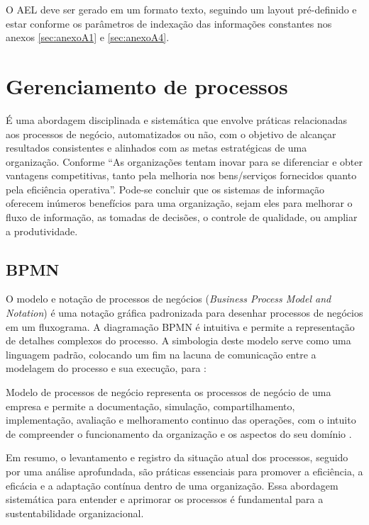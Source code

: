 O AEL deve ser gerado em um formato texto, seguindo um layout pré-definido e estar conforme os parâmetros de indexação das informações constantes nos anexos \ref{sec:anexoA1} e \ref{sec:anexoA4}.

\section{Gerenciamento de processos}
É uma abordagem disciplinada e sistemática que envolve práticas relacionadas aos processos de negócio, automatizados ou não, com o objetivo de alcançar resultados consistentes e alinhados com as metas estratégicas de uma organização. 
Conforme  ``As organizações tentam inovar para se diferenciar e obter vantagens competitivas, tanto pela melhoria nos bens/serviços fornecidos quanto pela eficiência operativa''.
 Pode-se concluir que os sistemas de informação oferecem inúmeros benefícios para uma organização, sejam eles para melhorar o fluxo de informação, as tomadas de decisões, o controle de qualidade, ou ampliar a produtividade.
 
 \subsection{BPMN}
O modelo e notação de processos de negócios (\textit{Business Process Model and Notation}) é uma notação gráfica padronizada para desenhar processos de negócios em um fluxograma. A diagramação BPMN é intuitiva e permite a representação de detalhes complexos do processo. A simbologia deste modelo serve como uma linguagem padrão, colocando um fim na lacuna de comunicação entre a modelagem do processo e sua execução, para :
\begin{citacao}
	
	Modelo de processos de negócio representa os processos de negócio de uma empresa e permite a documentação, simulação, compartilhamento, implementação, avaliação e melhoramento continuo das operações, com o intuito de compreender o funcionamento da organização e os aspectos do seu domínio \cite{bitencourt2016elicitaccao}.
	
\end{citacao}
Em resumo, o levantamento e registro da situação atual dos processos, seguido por uma análise aprofundada, são práticas essenciais para promover a eficiência, a eficácia e a adaptação contínua dentro de uma organização. Essa abordagem sistemática para entender e aprimorar os processos é fundamental para a sustentabilidade organizacional.


